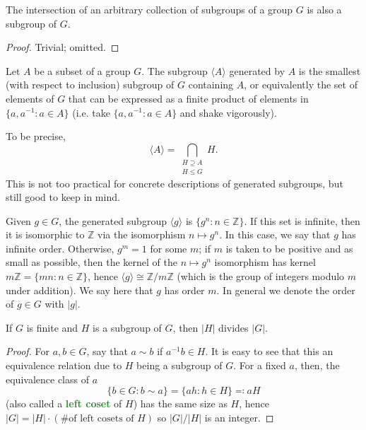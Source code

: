 \documentclass[11pt]{scrartcl}
\providecommand{\ZZ}{\mathbb Z}
\providecommand{\inv}{^{-1}}
\providecommand{\vocab}[1]{{\textbf{\textcolor{ForestGreen}{#1}}}}
\providecommand{\abs}[1]{\left|#1\right|}
\begin{document}
\begin{prop}
    \label{prop:subgrp-intersection}
    The intersection of an arbitrary collection of subgroups
    of a group $G$ is also a subgroup of $G$.
\end{prop}

\begin{proof}
    Trivial; omitted.
\end{proof}

\begin{definition}
    \label{def:generated-subgrp}
    Let $A$ be a subset of a group $G$.
    The subgroup $\langle A\rangle$ generated by $A$
    is the smallest (with respect to inclusion)
    subgroup of $G$ containing $A$, or equivalently
    the set of elements of $G$ that can be expressed as
    a finite product of elements in $\{a,a\inv : a\in A\}$
    (i.e. take $\{a,a\inv : a\in A\}$ and shake vigorously).
\end{definition}

To be precise,
\begin{equation*}
    \langle A\rangle = \bigcap_{\substack{H\supseteq A\\ H\le G}} H.
\end{equation*}
This is not too practical for concrete descriptions of generated subgroups,
but still good to keep in mind.

\begin{example}
    Given $g\in G$, the generated subgroup $\langle g\rangle$
    is $\{g^n : n\in\ZZ\}$. If this set is infinite,
    then it is isomorphic to $\ZZ$ via the isomorphism $n\mapsto g^n$.
    In this case, we say that $g$ has infinite order.
    Otherwise, $g^m = 1$ for some $m$; if $m$ is taken to be
    positive and as small as possible, then
    the kernel of the $n\mapsto g^n$ isomorphism has kernel
    $m\ZZ = \{mn : n\in\ZZ\}$, hence $\langle g\rangle \cong \ZZ/m\ZZ$
    (which is the group of integers modulo $m$ under addition).
    We say here that $g$ has order $m$.
    In general we denote the order of $g\in G$ with $\abs g$.
\end{example}

\begin{theorem}[Lagrange]
    \label{thm:lagrange-thm}
    If $G$ is finite and $H$ is a subgroup of $G$,
    then $\abs H$ divides $\abs G$.
\end{theorem}

\begin{proof}
    For $a,b\in G$, say that $a\sim b$ if $a\inv b \in H$.
    It is easy to see that this an equivalence relation
    due to $H$ being a subgroup of $G$. For a fixed $a$, then,
    the equivalence class of $a$
    \begin{equation*}
	\{b\in G : b\sim a\} = \{ah : h\in H\} \eqcolon aH
    \end{equation*}
    (also called a \vocab{left coset} of $H$)
    has the same size as $H$, hence
    $\abs G = \abs H\cdot(\text{\# of left cosets of $H$})$
    so $\abs G/\abs H$ is an integer.
\end{proof}
\end{document}
